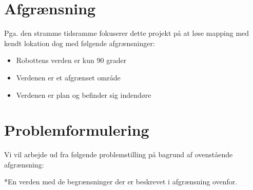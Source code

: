 \section*{Afgrænsning}
Pga. den stramme tidsramme fokuserer dette projekt på at løse mapping med kendt lokation dog med følgende afgrænsninger:
\begin{itemize}
\item Robottens verden er kun 90 grader
\item Verdenen er et afgrænset område
\item Verdenen er plan og befinder sig indendøre
\end{itemize}

\section*{Problemformulering}
Vi vil arbejde ud fra følgende problemstilling på bagrund af ovenstående afgrænsning:

\begin{samepage}


\end{samepage}
*En verden med de begrænsninger der er beskrevet i afgrænsning ovenfor.